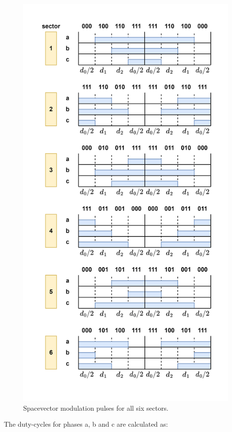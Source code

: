 \documentclass[]{book}
\begin{document}
\begin{figure}
\includegraphics[width=1\linewidth]{images/modulation/svm-pulses} \caption{Spacevector modulation pulses for all six sectors.}\label{fig:unnamed-chunk-4}
\end{figure}

The duty-cycles for phases a, b and c are calculated as:
\end{document}
